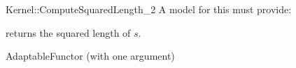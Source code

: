 \begin{ccRefFunctionObjectConcept}{Kernel::ComputeSquaredLength_2}
A model for this must provide:


       {returns the squared length of $s$. }

\ccRefines
AdaptableFunctor (with one argument)

\ccSeeAlso
{} \\

\end{ccRefFunctionObjectConcept}
